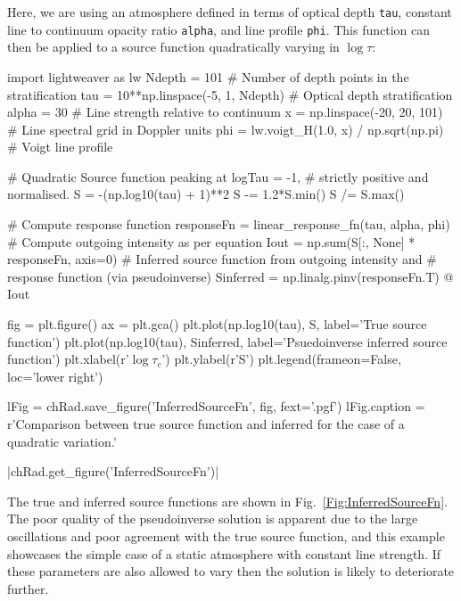 Here, we are using an atmosphere defined in terms of optical depth \texttt{tau}, constant line to continuum opacity ratio \texttt{alpha}, and line profile \texttt{phi}.
This function can then be applied to a source function quadratically varying in $\log \tau$:

\begin{pyblock}[Radynversion]
import lightweaver as lw
Ndepth = 101 # Number of depth points in the stratification
tau = 10**np.linspace(-5, 1, Ndepth) # Optical depth stratification
alpha = 30 # Line strength relative to continuum
x = np.linspace(-20, 20, 101) # Line spectral grid in Doppler units
phi = lw.voigt_H(1.0, x) / np.sqrt(np.pi) # Voigt line profile

# Quadratic Source function peaking at logTau = -1,
# strictly positive and normalised.
S = -(np.log10(tau) + 1)**2
S -= 1.2*S.min()
S /= S.max()

# Compute response function
responseFn = linear_response_fn(tau, alpha, phi)
# Compute outgoing intensity as per equation
Iout = np.sum(S[:, None] * responseFn, axis=0)
# Inferred source function from outgoing intensity and
# response function (via pseudoinverse)
Sinferred = np.linalg.pinv(responseFn.T) @ Iout
\end{pyblock}

\begin{pycode}[Radynversion]
fig = plt.figure()
ax = plt.gca()
plt.plot(np.log10(tau), S, label='True source function')
plt.plot(np.log10(tau), Sinferred, label='Psuedoinverse inferred source function')
plt.xlabel(r'$\log\tau_c$')
plt.ylabel(r'S')
plt.legend(frameon=False, loc='lower right')

lFig = chRad.save_figure('InferredSourceFn', fig, fext='.pgf')
lFig.caption = r'Comparison between true source function and inferred for the case of a quadratic variation.'
\end{pycode}

\py[Radynversion]|chRad.get_figure('InferredSourceFn')|

The true and inferred source functions are shown in Fig.~\ref{Fig:InferredSourceFn}.
The poor quality of the pseudoinverse solution is apparent due to the large oscillations and poor agreement with the true source function, and this example showcases the simple case of a static atmosphere with constant line strength.
If these parameters are also allowed to vary then the solution is likely to deteriorate further.


